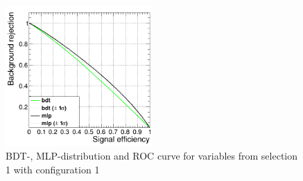 \documentclass[11pt]{scrartcl}
\begin{document}
\begin{figure}[H]
\begin{minipage}{.5\textwidth}
	  \label{fig:distr_s1_config1_mlp}
	\end{minipage}
	\centering
	\includegraphics[width=0.5\textwidth]{figures/MVA/select1/config1/FOM_selection1_nL5_nT400_mD1_nC10.png}
	\caption{BDT-, MLP-distribution and ROC curve for variables from selection 1 with configuration 1}
	 \label{fig:ROC_s1_config1}
	\end{figure}
	
\end{document}
